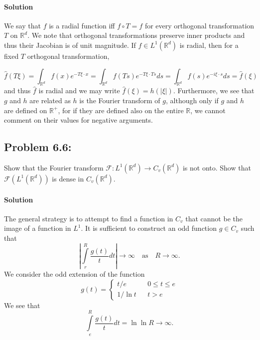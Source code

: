 \documentclass[letterpaper,twoside,11pt]{article}
\theoremstyle{mystyle}
\newcommand{\R}{{\mathbb R}}
\begin{document}
\paragraph*{Solution} 
We say that $f$ is a radial function iff $f \circ T = f$ for every orthogonal transformation $T$ on $\R^d$. We note that orthogonal transformations preserve inner products and thus their Jacobian is of unit magnitude. 
If $f\in L^1\left( \R^d \right)$ is radial, then for a fixed $T$ orthogonal transformation, 

\[\hat f\left( T\xi \right) = \int_{\R^d} f(x) e^{-T\xi\cdot x} = \int_{\R^d} f(Ts) e^{-T\xi\cdot Ts}ds = \int_{\R^d} f(s) e^{-i\xi \cdot s }ds = \hat f(\xi) \]
and thus $\hat f$ is radial and we may write $\hat f(\xi) = h(|\xi|)$. Furthermore, we see that $g$ and $h$ are related as $h$ is the Fourier transform of $g$, although only if $g$ and $h$ are defined on $\R^+$, for if they are defined also on the entire $\R$, we cannot comment on their values for negative arguments. 




\subsection*{Problem 6.6:}
Show that the Fourier transform $\mathcal F : L^1\left( \R^d \right)\to C_v\left( \R^d \right)$ is not onto. Show that $\mathcal F\left( L^1\left( \R^d \right) \right)$ is dense in $C_v\left( \R^d \right)$. 

\paragraph*{Solution} 
The general strategy is to attempt to find a function in $C_v$ that cannot be the image of a function in $L^1$. It is sufficient to construct an odd function $g\in C_v$ such that 
\[\left| \int\limits_r^R \frac{g(t)}{t}dt \right| \to \infty \quad \text{as} \quad R\to \infty.\]
We consider the odd extension of the function 
\[g(t) = \left\{ \begin{matrix}
  t/e && 0 \leq t \leq e\\
  1/\ln t &&t>e
\end{matrix}\right. \]
We see that 
\[\int\limits_e^R \frac{g(t)}{t}dt = \ln \ln R \to \infty.\]
\end{document}
